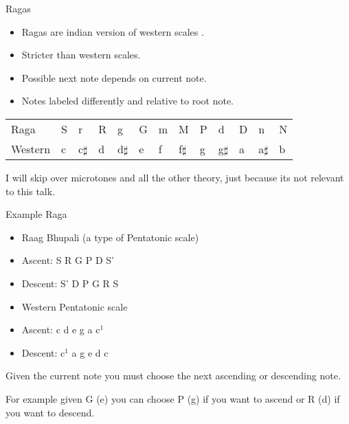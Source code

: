 \documentclass[10pt]{beamer}
\begin{document}

\begin{frame}{Ragas}


\begin{itemize}
\item Ragas are indian version of western scales \cite{Raga2011}.
\item Stricter than western scales.
\item Possible next note depends on current note.
\item Notes labeled differently and relative to root note.
\end{itemize}
\begin{center}
\begin{tabular}{l|llllllllllll}
Raga & S & r & R & g & G & m & M & P & d & D & n & N \\
Western & c & c$\sharp$ & d & d$\sharp$ & e & f & f$\sharp$ & g & g$\sharp$ & a & a$\sharp$ & b \\
\end{tabular}
\end{center}
I will skip over microtones and all the other theory, just because its not relevant to this talk.
\end{frame}

\begin{frame}{Example Raga}


\begin{itemize}
\item Raag Bhupali (a type of Pentatonic scale)
\item Ascent: S R G P D S'
\item Descent: S' D P G R S
\end{itemize}
\begin{itemize}
\item Western Pentatonic scale
\item Ascent: c d e g a c$^{1}$
\item Descent: c$^{1}$ a g e d c
\end{itemize}

Given the current note you must choose the next ascending or descending note.

For example given G (e) you can choose P (g) if you want to ascend or R (d) if you want to descend.
\end{frame}
\end{document}
